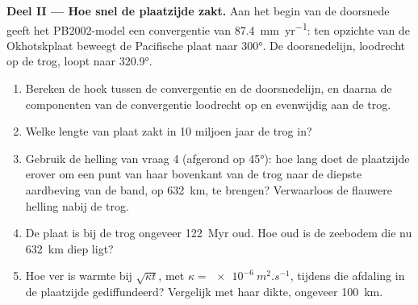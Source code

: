 \begin{problem}
\medskip
\noindent\textbf{Deel II --- Hoe snel de plaatzijde zakt.} Aan het begin van de doorsnede geeft het PB2002-model een convergentie van \qty{87.4}{mm.yr^{-1}}: ten opzichte van de Okhotskplaat beweegt de Pacifische plaat naar  \ang{300}. De doorsnedelijn, loodrecht op de trog, loopt naar  \ang{320.9}.
\begin{enumerate}[resume]
  \item Bereken de hoek tussen de convergentie en de doorsnedelijn, en daarna de componenten van de convergentie loodrecht op en evenwijdig aan de trog.
  \item Welke lengte van plaat zakt in 10 miljoen jaar de trog in?
  \item Gebruik de helling van vraag 4 (afgerond op \ang{45}): hoe lang doet de plaatzijde erover om een punt van haar bovenkant van de trog naar de diepste aardbeving van de band, op \qty{632}{km}, te brengen? Verwaarloos de flauwere helling nabij de trog.
  \item De plaat is bij de trog ongeveer \qty{122}{Myr} oud. Hoe oud is de zeebodem die nu \qty{632}{km} diep ligt?
  \item Hoe ver is warmte bij $\sqrt{\kappa t}$, met $\kappa = \qty{e-6}{m^2.s^{-1}}$, tijdens die afdaling in de plaatzijde gediffundeerd? Vergelijk met haar dikte, ongeveer \qty{100}{km}.
\end{enumerate}


\end{problem}
